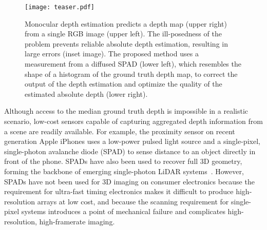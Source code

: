 

\begin{figure}
  \texttt{[image: teaser.pdf]}
  \caption{Monocular depth estimation predicts a depth map (upper right) from a
    single RGB image (upper left). The ill-posedness of the problem prevents
    reliable absolute depth estimation, resulting in large errors (inset image).
    The proposed method uses a measurement from a diffused SPAD (lower left),
    which resembles the shape of a histogram of the ground truth depth map, to
    correct the output of the depth estimation and optimize the quality of the
    estimated absolute depth (lower right).}
  \label{fig:teaser}
\end{figure}

Although access to the median ground truth depth is impossible in a realistic scenario, low-cost sensors capable of capturing aggregated depth information from a scene are readily available. For example, the proximity sensor on recent generation Apple iPhones uses a low-power pulsed light source and a single-pixel, single-photon avalanche diode (SPAD) to sense distance to an object directly in front of the phone. SPADs have also been used to recover full 3D geometry, forming the backbone of emerging single-photon LiDAR systems~\cite{Kirmani:2014,Li:2019,pawlikowska2017single}. However, SPADs have not been used for 3D imaging on consumer electronics because the requirement for ultra-fast timing electronics makes it difficult to produce high-resolution arrays at low cost, and because the scanning requirement for single-pixel systems introduces a point of mechanical failure and complicates high-resolution, high-framerate imaging. 

